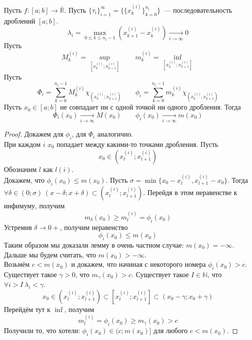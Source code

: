 \documentclass{article}
\begin{document}
    \begin{lemma}
        \label{lm:о последовательности дроблений}
        Пусть $f\colon[a;b]\to\overline{\mathbb R}$. Пусть $\{\tau_i\}_{i=1}^\infty=\{\{x_k^{(i)}\}_{k=0}^{n_i}\}$~--- последовательность дроблений $[a;b]$.
        $$\lambda_i=\max\limits_{0\leqslant k\leqslant n_i-1}(x_{k+1}^{(i)}-x_k^{(i)})\underset{i\to\infty}\longrightarrow0$$
        Пусть
        $$M_k^{(i)}=\sup\limits_{[x_k^{(i)};x_{k+1}^{(i)}]}\qquad m_k^{(i)}=\inf\limits_{[x_k^{(i)};x_{k+1}^{(i)}]}$$
        Пусть
        $$
        \Phi_i=\sum\limits_{k=0}^{n_i-1}M_k^{(i)}\chi_{(x_k^{(i)};x_{k+1}^{(i)})}\qquad \phi_i=\sum\limits_{k=0}^{n_i-1}m_k^{(i)}\chi_{(x_k^{(i)};x_{k+1}^{(i)})}
        $$
        Пусть $x_0\in[a;b]$ не совпадает ни с одной точкой ни одного дробления. Тогда
        $$
        \Phi_i(x_0)\underset{i\to\infty}\longrightarrow M(x_0)\qquad \phi_i(x_0)\underset{i\to\infty}\longrightarrow m(x_0)
        $$
    \end{lemma}
    \begin{proof}
        Докажем для $\phi_i$, для $\Phi_i$ аналогично.\\
        При каждом $i$ $x_0$ попадает между какими-то точками дробления. Пусть
        $$
        x_0\in(x_l^{(i)};x_{l+1}^{(i)})
        $$
        Обозначим $l$ как $l(i)$.\\
        Докажем, что $\phi_i(x_0)\leqslant m(x_0)$. Пусть $\sigma=\min\{x_0-x_l^{(i)},x_{l+1}^{(i)}-x_0\}$. Тогда $\forall\delta\in(0;\sigma)~(x-\delta;x+\delta)\subset(x_l^{(i)};x_{l+1}^{(i)})$. Перейдя в этом неравенстве к инфимуму, получим
        $$
        m_\delta(x_0)\geqslant m_l^{(i)}=\phi_i(x_0)
        $$
        Устремив $\delta\to0+$, получим неравенство
        $$\phi_i(x_0)\leqslant m(x_0)$$
        Таким образом мы доказали лемму в очень частном случае: $m(x_0)=-\infty$. Дальше мы будем считать, что $m(x_0)>-\infty$.\\
        Возьмём $c<m(x_0)$ и докажем, что начиная с некоторого номера $\phi_i(x_0)>c$.\\
        Существует такое $\gamma>0$, что $m_\gamma(x_0)>c$. Существует такое $I\in\mathbb N$, что $\forall i>I~\lambda_i<\gamma$.
        $$
        x_0\in(x_l^{(i)};x_{l+1}^{(i)})\subset[x_l^{(i)};x_{l+1}^{(i)}]\subset(x_0-\gamma;x_0+\gamma)
        $$
        Перейдём тут к $\inf$, получим
        $$
        m_l^{(i)}=\phi_i(x_0)\geqslant m_\gamma(x_0)>c
        $$
        Получили то, что хотели: $\phi_i(x_0)\in(c;m(x_0)]$ для любого $c<m(x_0)$.
    \end{proof}
\end{document}
